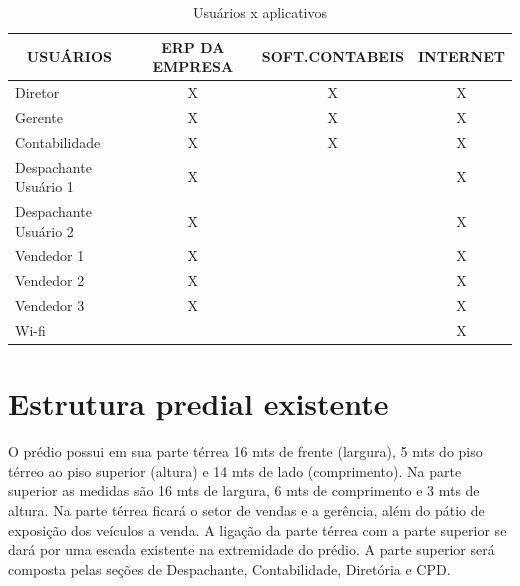 \documentclass[	DIV=calc,%
							paper=a4,%
							fontsize=12pt,%
							onecolumn]{scrartcl}	 					%
\begin{document}
\begin{table}[H] %
		\caption{Usuários x aplicativos}
	\centering
	\begin{tabular}{|l|c|c|c|}
		\hline
		\multicolumn{1}{|c|}{\textbf{USUÁRIOS}} & \textbf{ERP DA EMPRESA} & \textbf{SOFT.CONTABEIS} & \textbf{INTERNET} \\ \hline
		Diretor                                 & X                       & X                       & X                 \\ \hline
		Gerente                                 & X                       & X                       & X                 \\ \hline
		Contabilidade                           & X                       & X                       & X                 \\ \hline
		Despachante Usuário 1                   & X                       &                         & X                 \\ \hline
		Despachante Usuário 2                   & X                       &                         & X                 \\ \hline
		Vendedor 1                              & X                       &                         & X                 \\ \hline
		Vendedor 2                              & X                       &                         & X                 \\ \hline
		Vendedor 3                              & X                       &                         & X                 \\ \hline
		Wi-fi                     &                        &                         & X                 \\ \hline		
	\end{tabular}
\end{table}


\section{Estrutura predial existente}

O prédio possui em sua parte térrea 16 mts de frente (largura), 5 mts do piso térreo ao piso superior (altura) e 14 mts de lado (comprimento). Na parte superior as medidas são 16 mts de largura, 6 mts de comprimento e 3 mts de altura.
Na parte térrea ficará o setor de vendas e a gerência, além do pátio de exposição dos veículos a venda. A ligação da parte térrea com a parte superior se dará por uma escada existente na extremidade do prédio.
A parte superior será composta pelas seções de Despachante, Contabilidade, Diretória e CPD.    
\end{document}
